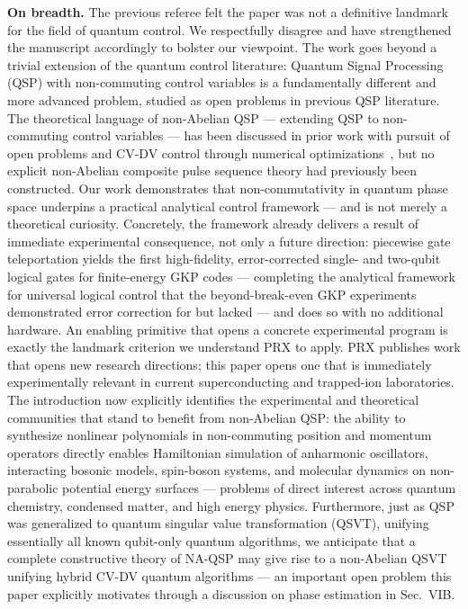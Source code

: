 \documentclass[11pt, letterpaper]{article}
\begin{document}
\textbf{On breadth.} The previous referee felt the paper was not a definitive landmark for the field of quantum control. We respectfully disagree and have strengthened the manuscript accordingly to bolster our viewpoint. The work goes beyond a trivial extension of the quantum control literature: Quantum Signal Processing (QSP) with non-commuting control variables is a fundamentally different and more advanced problem, studied as open problems in previous QSP literature. The theoretical language of non-Abelian QSP --- extending QSP to non-commuting control variables --- has been discussed in prior work with pursuit of open problems and CV-DV control through numerical optimizations~\cite{nemeth2023variants,hastrup2021improved,hastrup2021measurement,eickbusch2022fast}, but no explicit non-Abelian composite pulse sequence theory had previously been constructed. Our work demonstrates that non-commutativity in quantum phase space underpins a practical analytical control framework --- and is not merely a theoretical curiosity. Concretely, the framework already delivers a result of immediate experimental consequence, not only a future direction: piecewise gate teleportation yields the first high-fidelity, error-corrected single- and two-qubit logical gates for finite-energy GKP codes --- completing the analytical framework for universal logical control that the beyond-break-even GKP experiments demonstrated error correction for but lacked --- and does so with no additional hardware. An enabling primitive that opens a concrete experimental program is exactly the landmark criterion we understand PRX to apply. PRX publishes work that opens new research directions; this paper opens one that is immediately experimentally relevant in current superconducting and trapped-ion laboratories. The introduction now explicitly identifies the experimental and theoretical communities that stand to benefit from non-Abelian QSP: the ability to synthesize nonlinear polynomials in non-commuting position and momentum operators directly enables Hamiltonian simulation of anharmonic oscillators, interacting bosonic models, spin-boson systems, and molecular dynamics on non-parabolic potential energy surfaces --- problems of direct interest across quantum chemistry, condensed matter, and high energy physics. Furthermore, just as QSP was generalized to quantum singular value transformation (QSVT), unifying essentially all known qubit-only quantum algorithms, we anticipate that a complete constructive theory of NA-QSP may give rise to a non-Abelian QSVT unifying hybrid CV-DV quantum algorithms --- an important open problem this paper explicitly motivates through a discussion on phase estimation in Sec.~VIB.
\end{document}
